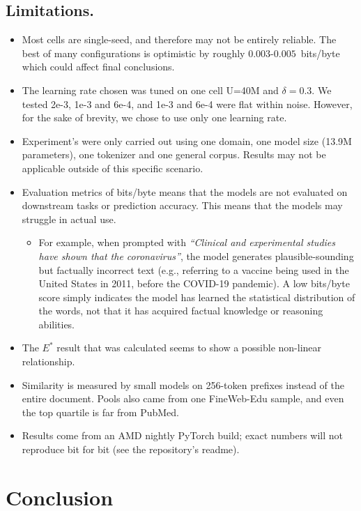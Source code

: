 \documentclass[10pt,a4paper]{article}
\newcommand{\bpb}{bits/byte}
\begin{document}
\subsection{Limitations.}
\begin{itemize}
\item Most cells are single-seed, and therefore may not be entirely reliable. The best of many configurations is optimistic by roughly $0.003$-$0.005$~\bpb{} which could affect final conclusions. 
\item The learning rate chosen was tuned on one cell U=40M and $\delta=0.3$. We tested 2e-3, 1e-3 and 6e-4, and 1e-3 and 6e-4 were flat within noise. However, for the sake of brevity, we chose to use only one learning rate.
\item Experiment's were only carried out using one domain, one model size (13.9M parameters), one tokenizer and one general corpus. Results may not be applicable outside of this specific scenario. 
\item Evaluation metrics of \bpb{} means that the models are not evaluated on downstream tasks or prediction accuracy. This means that the models may struggle in actual use. 
\begin{itemize}
\item For example, when prompted with \textit{``Clinical and experimental studies have shown that the coronavirus''}, the model generates plausible-sounding but factually incorrect text (e.g., referring to a vaccine being used in the United States in 2011, before the COVID-19 pandemic). A low \bpb{} score simply indicates the model has learned the statistical distribution of the words, not that it has acquired factual knowledge or reasoning abilities.
\end{itemize}
\item The $E^*$ result that was calculated seems to show a possible non-linear relationship. 
\item Similarity is measured by small models on 256-token prefixes instead of the entire document. Pools also came from one FineWeb-Edu sample, and even the top quartile is far from PubMed.
\item Results come from an AMD nightly PyTorch build; exact numbers will not reproduce bit for bit (see the repository's readme).
\end{itemize}

\section{Conclusion}
\end{document}
